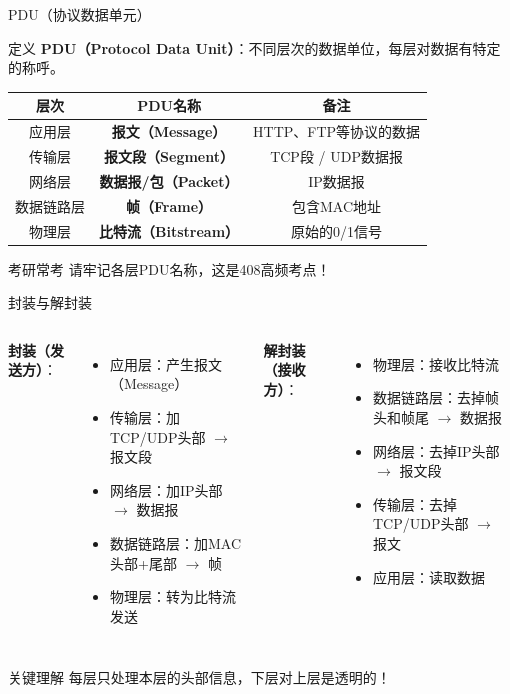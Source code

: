 \documentclass[10pt, aspectratio=169]{beamer}
\begin{document}
\begin{frame}{PDU（协议数据单元）}
    \begin{block}{定义}
        \textbf{PDU（Protocol Data Unit）}：不同层次的数据单位，每层对数据有特定的称呼。
    \end{block}
    \vspace{0.5em}
    \begin{table}
        \begin{tabular}{|c|c|c|}
            \hline
            \textbf{层次} & \textbf{PDU名称} & \textbf{备注} \\ \hline
            应用层 & \textbf{报文（Message）} & HTTP、FTP等协议的数据 \\
            传输层 & \textbf{报文段（Segment）} & TCP段 / UDP数据报 \\
            网络层 & \textbf{数据报/包（Packet）} & IP数据报 \\
            数据链路层 & \textbf{帧（Frame）} & 包含MAC地址 \\
            物理层 & \textbf{比特流（Bitstream）} & 原始的0/1信号 \\
            \hline
        \end{tabular}
    \end{table}
    \vspace{0.3em}
    \begin{block}{考研常考}
        请牢记各层PDU名称，这是408高频考点！
    \end{block}
\end{frame}

\begin{frame}{封装与解封装}
    \begin{columns}[T]
        \textbf{封装（发送方）}：
        \begin{itemize}
            \item 应用层：产生报文（Message）
            \item 传输层：加TCP/UDP头部 $\to$ 报文段
            \item 网络层：加IP头部 $\to$ 数据报
            \item 数据链路层：加MAC头部+尾部 $\to$ 帧
            \item 物理层：转为比特流发送
        \end{itemize}
        \textbf{解封装（接收方）}：
        \begin{itemize}
            \item 物理层：接收比特流
            \item 数据链路层：去掉帧头和帧尾 $\to$ 数据报
            \item 网络层：去掉IP头部 $\to$ 报文段
            \item 传输层：去掉TCP/UDP头部 $\to$ 报文
            \item 应用层：读取数据
        \end{itemize}
    \end{columns}
    \vspace{0.5em}
    \begin{exampleblock}{关键理解}
        每层只处理本层的头部信息，下层对上层是透明的！
    \end{exampleblock}
\end{frame}
\end{document}
